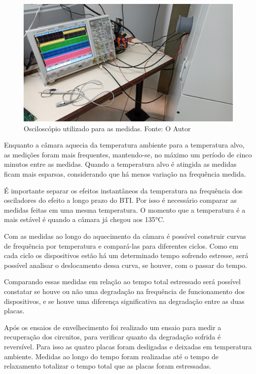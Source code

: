 \begin{figure}[H]
    \centering
    \includegraphics[width=\linewidth]{figures/Metodologia/Ensaios_Osciloscopio.jpg}
    \caption{Osciloscópio utilizado para as medidas. Fonte: O Autor}
    \label{fig:Osciloscopio}
\end{figure}

Enquanto a câmara aquecia da temperatura ambiente para a temperatura alvo, as medições foram mais frequentes, mantendo-se, no máximo um período de cinco minutos entre as medidas. Quando a temperatura alvo é atingida as medidas ficam mais esparsas, considerando que há menos variação na frequência medida.

É importante separar os efeitos instantâneos da temperatura na frequência dos osciladores do efeito a longo prazo do BTI. Por isso é necessário comparar as medidas feitas em uma mesma temperatura. O momento que a temperatura é a mais estável é quando a câmara já chegou aos 135°C.

Com as medidas ao longo do aquecimento da câmara é possível construir curvas de frequência por temperatura e compará-las para diferentes ciclos. Como em cada ciclo os dispositivos estão há um determinado tempo sofrendo estresse, será possível analisar o deslocamento dessa curva, se houver, com o passar do tempo.

Comparando essas medidas em relação ao tempo total estressado será possível constatar se houve ou não uma degradação na frequência de funcionamento dos dispositivos, e se houve uma diferença significativa na degradação entre as duas placas.

Após os ensaios de envelhecimento foi realizado um ensaio para medir a recuperação dos circuitos, para verificar quanto da degradação sofrida é reversível. Para isso as quatro placas foram desligadas e deixadas em temperatura ambiente. Medidas ao longo do tempo foram realizadas até o tempo de relaxamento totalizar o tempo total que as placas foram estressadas.

